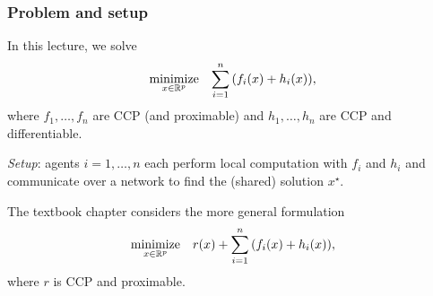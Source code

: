 \documentclass[10pt,mathserif]{beamer}
\begin{document}
\begin{frame}
\frametitle{Problem and setup}
In this lecture, we solve
\begin{equation}
\begin{array}{ll}
\underset{x\in\mathbb{R}^p}{\mbox{minimize}} & \displaystyle{\sum_{i=1}^n \left(f_i(x)+h_i(x)\right)},
\end{array}
\label{eq:dist-main-opt}
\end{equation}
where $f_1,\dots,f_n$ are CCP (and proximable) and $h_1,\dots,h_n$ are CCP and differentiable.
\pause\bigskip

\emph{Setup}: agents $i=1,\dots,n$ each perform local computation with $f_i$ and $h_i$ and communicate over a network to find the (shared) solution $x^\star$.
\pause\bigskip

The textbook chapter considers the more general formulation
\begin{equation}
\begin{array}{ll}
\underset{x\in\mathbb{R}^p}{\mbox{minimize}} & r(x)+\displaystyle{\sum_{i=1}^n \left(f_i(x)+h_i(x)\right)},
\end{array}
\end{equation}
where $r$ is CCP and proximable.



\end{frame}


\end{document}
